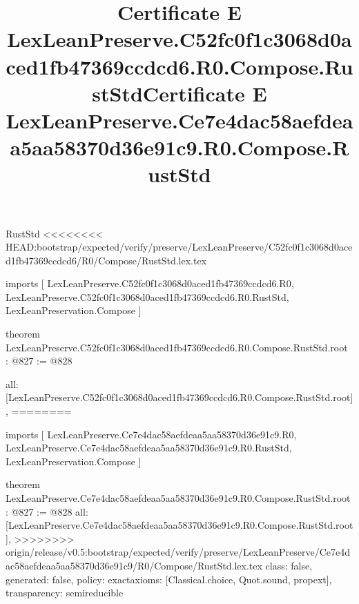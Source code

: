 \begin{lexlean}{RustStd}
<<<<<<<< HEAD:bootstrap/expected/verify/preserve/LexLeanPreserve/C52fc0f1c3068d0aced1fb47369ccdcd6/R0/Compose/RustStd.lex.tex
\title{Certificate E LexLeanPreserve.C52fc0f1c3068d0aced1fb47369ccdcd6.R0.Compose.RustStd}
\begin{coremodule}
imports [
  LexLeanPreserve.C52fc0f1c3068d0aced1fb47369ccdcd6.R0,
  LexLeanPreserve.C52fc0f1c3068d0aced1fb47369ccdcd6.R0.RustStd,
  LexLeanPreservation.Compose
]

theorem LexLeanPreserve.C52fc0f1c3068d0aced1fb47369ccdcd6.R0.Compose.RustStd.root : @827 := @828 {
  all: [LexLeanPreserve.C52fc0f1c3068d0aced1fb47369ccdcd6.R0.Compose.RustStd.root],
========
\title{Certificate E LexLeanPreserve.Ce7e4dac58aefdeaa5aa58370d36e91c9.R0.Compose.RustStd}
\begin{coremodule}
imports [
  LexLeanPreserve.Ce7e4dac58aefdeaa5aa58370d36e91c9.R0,
  LexLeanPreserve.Ce7e4dac58aefdeaa5aa58370d36e91c9.R0.RustStd,
  LexLeanPreservation.Compose
]

theorem LexLeanPreserve.Ce7e4dac58aefdeaa5aa58370d36e91c9.R0.Compose.RustStd.root : @827 := @828 {
  all: [LexLeanPreserve.Ce7e4dac58aefdeaa5aa58370d36e91c9.R0.Compose.RustStd.root],
>>>>>>>> origin/release/v0.5:bootstrap/expected/verify/preserve/LexLeanPreserve/Ce7e4dac58aefdeaa5aa58370d36e91c9/R0/Compose/RustStd.lex.tex
  class: false,
  generated: false,
  policy: exact{axioms: [Classical.choice, Quot.sound, propext]},
  transparency: semireducible
}


\end{coremodule}}
\end{coremodule}
\end{lexlean}
